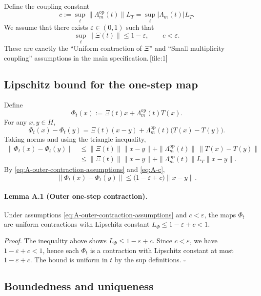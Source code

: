\documentclass[11pt]{article}
\begin{document}
Define the coupling constant
\begin{equation}
c := \sup_t \|\Lambda_m^{\mathrm{op}}(t)\| L_T
     = \sup_t |\Lambda_m(t)| L_T.
\label{eq:A-c}
\end{equation}
We assume that there exists $\varepsilon\in(0,1)$ such that
\begin{equation}
\sup_t \|\Xi(t)\| \le 1-\varepsilon,
\qquad
c < \varepsilon.
\label{eq:A-outer-contraction-assumptions}
\end{equation}
These are exactly the ``Uniform contraction of $\Xi$'' and ``Small multiplicity coupling'' assumptions in the main specification.\,[file:1]

\subsection{Lipschitz bound for the one-step map}

Define
\[
\Phi_t(x) := \Xi(t) x + \Lambda_m^{\mathrm{op}}(t) T(x).
\]
For any $x,y\in H$,
\[
\Phi_t(x) - \Phi_t(y) 
= \Xi(t)(x-y) + \Lambda_m^{\mathrm{op}}(t)\bigl(T(x)-T(y)\bigr).
\]
Taking norms and using the triangle inequality,
\begin{align*}
\|\Phi_t(x)-\Phi_t(y)\|
&\le \|\Xi(t)\|\|x-y\| + \|\Lambda_m^{\mathrm{op}}(t)\|\,\|T(x)-T(y)\| \\
&\le \|\Xi(t)\|\|x-y\| + \|\Lambda_m^{\mathrm{op}}(t)\| L_T \|x-y\|.
\end{align*}
By \eqref{eq:A-outer-contraction-assumptions} and \eqref{eq:A-c},
\[
\|\Phi_t(x)-\Phi_t(y)\|
\le \bigl(1-\varepsilon + c\bigr) \|x-y\|.
\]

\paragraph{Lemma A.1 (Outer one-step contraction).}
Under assumptions \eqref{eq:A-outer-contraction-assumptions} and $c<\varepsilon$, the maps $\Phi_t$ are uniform contractions with Lipschitz constant $L_\Phi\le 1-\varepsilon+c < 1$.

\medskip
\noindent\emph{Proof.}
The inequality above shows $L_\Phi\le 1-\varepsilon+c$. Since $c<\varepsilon$, we have $1-\varepsilon+c<1$, hence each $\Phi_t$ is a contraction with Lipschitz constant at most $1-\varepsilon+c$. The bound is uniform in $t$ by the sup definitions. \hfill$\square$

\subsection{Boundedness and uniqueness}
\end{document}
